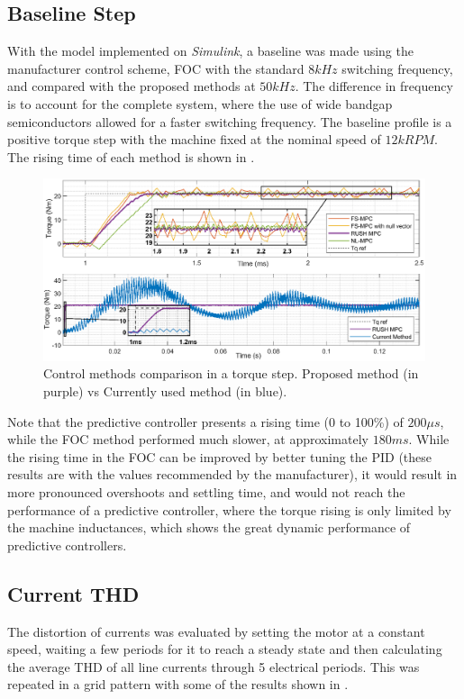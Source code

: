 \documentclass[9pt,conference]{IEEEtran}
\begin{document}
\subsection{Baseline Step}
With the model implemented on \textit{Simulink}, a baseline was made using the manufacturer control scheme, FOC with the standard $8kHz$ switching frequency, and compared with the proposed methods at $50kHz$. The difference in frequency is to account for the complete system, where the use of wide bandgap semiconductors allowed for a faster switching frequency. The baseline profile is a positive torque step with the machine fixed at the nominal speed of $12kRPM$. The rising time of each method is shown in .
\begin{figure}[!htb]
	\centering
    \includegraphics[clip, trim=0cm 0cm 0cm 5.5cm,width=.8\linewidth]{Figures/Step_@12000RPM.eps}
	\caption[Control methods comparison in a torque step.]{Control methods comparison in a torque step. Proposed method (in purple) vs Currently used method (in blue).}
	\label{fig:rising_time_4_models} %
\end{figure}

Note that the predictive controller presents a rising time (0 to 100\%) of $200\mu s$, while the FOC method performed much slower, at approximately $180ms$. While the rising time in the FOC can be improved by better tuning the PID (these results are with the values recommended by the manufacturer), it would result in more pronounced overshoots and settling time, and would not reach the performance of a predictive controller, where the torque rising is only limited by the machine inductances, which shows the great dynamic performance of predictive controllers.

\subsection{Current THD}

The distortion of currents was evaluated by setting the motor at a constant speed, waiting a few periods for it to reach a steady state and then calculating the average THD of all line currents through 5 electrical periods. This was repeated in a grid pattern with some of the results shown in .
\end{document}
